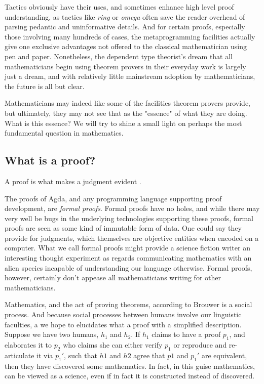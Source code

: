 Tactics obviously have their uses, and sometimes enhance high level proof
understanding, as tactics like \emph{ring} or \emph{omega} often save the reader overhead
of parsing pedantic and uninformative details. And for certain proofs,
especially those involving many hundreds of cases, the metaprogramming
facilities actually give one exclusive advantages not offered to the classical
mathematician using pen and paper. Nonetheless, the dependent type theorist's
dream that all mathematicians begin using theorem provers in their everyday work
is largely just a dream, and with relatively little mainstream adoption by
mathematicians, the future is all but clear.

Mathematicians may indeed like some of the facilities theorem provers provide,
but ultimately, they may not see that as the "essence" of what they are doing.
What is this essence? We will try to shine a small light on perhaps the most
fundamental question in mathematics.

\subsection{What is a proof?}

\begin{displayquote}

A proof is what makes a judgment evident \cite{mlMeanings}.

\end{displayquote}

The proofs of Agda, and any programming language supporting proof development,
are \emph{formal proofs}. Formal proofs have no holes, and while there may very
well be bugs in the underlying technologies supporting these proofs, formal
proofs are seen as some kind of immutable form of data. One could say they
provide \cite{objective evidence} for judgments, which themselves are objective
entities when encoded on a computer. What we call
formal proofs might provide a science fiction writer an interesting thought
experiment as regards communicating mathematics with an alien species incapable
of understanding our language otherwise. Formal proofs, however, certainly don't appease all
mathematicians writing for other mathematicians.

Mathematics, and the act of proving theorems, according to Brouwer is a social
process. And because social processes between humans involve our linguistic
faculties, a we hope to elucidates what a proof with a simplified description.
Suppose we have two humans, $h_1$ and $h_2$. If $h_1$ claims to have a proof
$p_1$, and elaborates it to $p_2$ who claims she can either verify $p_1$ or
reproduce and re-articulate it via $p_1'$, such that $h1$ and $h2$ agree that
$p1$ and $p_1'$ are equivalent, then they have discovered some mathematics. In
fact, in this guise mathematics, can be viewed as a science, even if in fact it
is constructed instead of discovered.

